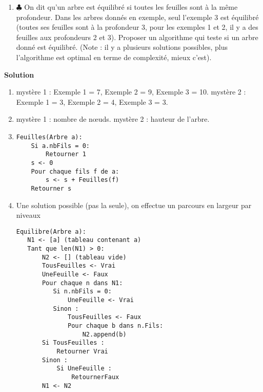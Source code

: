 \begin{exercice}
\begin{enumerate}
\item $\clubsuit$ On dit qu'un arbre est équilibré si toutes les feuilles sont à la même profondeur. Dans les arbres donnés en exemple, seul l'exemple 3 est équilibré (toutes ses feuilles sont à la profondeur 3, pour les exemples 1 et 2, il y a des feuilles aux profondeurs 2 et 3). Proposer un algorithme qui teste si un arbre donné est équilibré. (Note : il y a plusieurs solutions possibles, plus l'algorithme est optimal en terme de complexité, mieux c'est).

\end{enumerate}

\textbf{Solution}

\begin{enumerate}
\item mystère 1 : Exemple 1 = 7, Exemple 2 = 9, Exemple 3 = 10. mystère 2 : Exemple 1 = 3, Exemple 2 = 4, Exemple 3 = 3.

\item mystère 1 : nombre de n\oe uds. mystère 2 : hauteur de l'arbre.

\item 

\begin{lstlisting}
Feuilles(Arbre a):
    Si a.nbFils = 0:
        Retourner 1
    s <- 0
    Pour chaque fils f de a:
        s <- s + Feuilles(f)
    Retourner s
\end{lstlisting}


\item Une solution possible (pas la seule), on effectue un parcours en largeur par niveaux

\begin{lstlisting}
Equilibre(Arbre a):
   N1 <- [a] (tableau contenant a)
   Tant que len(N1) > 0:
       N2 <- [] (tableau vide)
       TousFeuilles <- Vrai
       UneFeuille <- Faux
       Pour chaque n dans N1:
          Si n.nbFils = 0:
              UneFeuille <- Vrai
          Sinon :
              TousFeuilles <- Faux
              Pour chaque b dans n.Fils:
                  N2.append(b)
       Si TousFeuilles :
           Retourner Vrai
       Sinon :
           Si UneFeuille :
               RetournerFaux
       N1 <- N2
       
   
\end{lstlisting}

\end{enumerate}


\end{exercice}